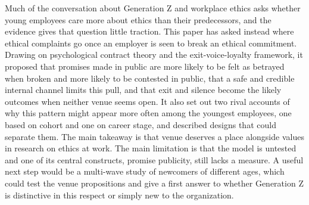 Much of the conversation about Generation Z and workplace ethics asks whether young employees care more about ethics than their predecessors, and the evidence gives that question little traction. This paper has asked instead where ethical complaints go once an employer is seen to break an ethical commitment. Drawing on psychological contract theory and the exit-voice-loyalty framework, it proposed that promises made in public are more likely to be felt as betrayed when broken and more likely to be contested in public, that a safe and credible internal channel limits this pull, and that exit and silence become the likely outcomes when neither venue seems open. It also set out two rival accounts of why this pattern might appear more often among the youngest employees, one based on cohort and one on career stage, and described designs that could separate them. The main takeaway is that venue deserves a place alongside values in research on ethics at work. The main limitation is that the model is untested and one of its central constructs, promise publicity, still lacks a measure. A useful next step would be a multi-wave study of newcomers of different ages, which could test the venue propositions and give a first answer to whether Generation Z is distinctive in this respect or simply new to the organization.
